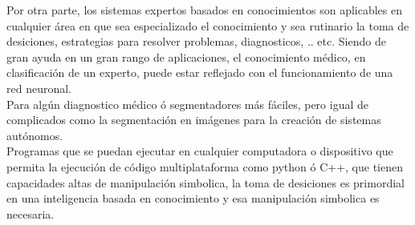 \documentclass[a4paper, 11pt]{article}
\begin{document}
Por otra parte, los sistemas expertos basados en conocimientos son aplicables en cualquier  área en que sea especializado el conocimiento y sea rutinario la toma de desiciones, estrategias para resolver problemas, diagnosticos, .. etc. Siendo de gran ayuda en un gran rango de aplicaciones, el conocimiento médico, en clasificación de un experto, puede estar reflejado con el funcionamiento de una red neuronal.\\

Para algún diagnostico médico ó segmentadores más fáciles, pero igual de complicados como la segmentación en imágenes para la creación de sistemas autónomos.\\

Programas que se puedan ejecutar en cualquier computadora o dispositivo que permita la ejecución de código multiplataforma como python ó C++, que tienen capacidades altas de manipulación simbolica, la toma de desiciones es primordial en una inteligencia basada en conocimiento y esa manipulación simbolica es necesaria.








\end{document}
